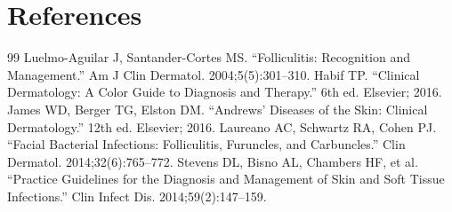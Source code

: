 \section*{References}
\begin{thebibliography}{99}
 Luelmo-Aguilar J, Santander-Cortes MS. ``Folliculitis: Recognition and Management.'' Am J Clin Dermatol. 2004;5(5):301--310.
 Habif TP. ``Clinical Dermatology: A Color Guide to Diagnosis and Therapy.'' 6th ed. Elsevier; 2016.
 James WD, Berger TG, Elston DM. ``Andrews' Diseases of the Skin: Clinical Dermatology.'' 12th ed. Elsevier; 2016.
 Laureano AC, Schwartz RA, Cohen PJ. ``Facial Bacterial Infections: Folliculitis, Furuncles, and Carbuncles.'' Clin Dermatol. 2014;32(6):765--772.
 Stevens DL, Bisno AL, Chambers HF, et al. ``Practice Guidelines for the Diagnosis and Management of Skin and Soft Tissue Infections.'' Clin Infect Dis. 2014;59(2):147--159.
\end{thebibliography}
